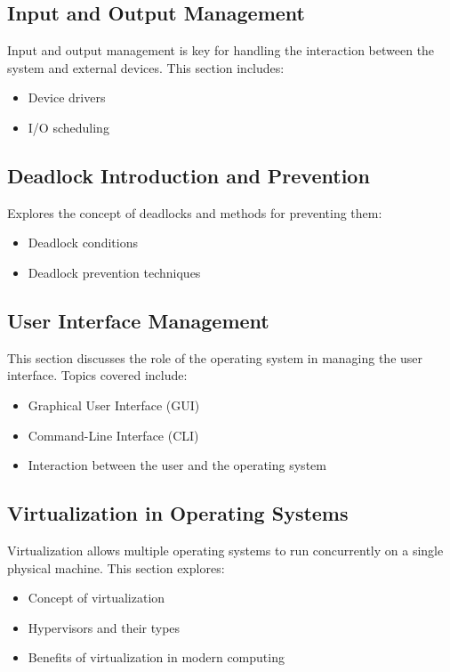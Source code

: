 \documentclass[12pt]{article}
\begin{document}
	\subsection{Input and Output Management}
	Input and output management is key for handling the interaction between the system and external devices. This section includes:
	\begin{itemize}
		\item Device drivers
		\item I/O scheduling
	\end{itemize}
	
	\subsection{Deadlock Introduction and Prevention}
	Explores the concept of deadlocks and methods for preventing them:
	\begin{itemize}
		\item Deadlock conditions
		\item Deadlock prevention techniques
	\end{itemize}
	
	\subsection{User Interface Management}
	This section discusses the role of the operating system in managing the user interface. Topics covered include:
	\begin{itemize}
		\item Graphical User Interface (GUI)
		\item Command-Line Interface (CLI)
		\item Interaction between the user and the operating system
	\end{itemize}
	
	\subsection{Virtualization in Operating Systems}
	Virtualization allows multiple operating systems to run concurrently on a single physical machine. This section explores:
	\begin{itemize}
		\item Concept of virtualization
		\item Hypervisors and their types
		\item Benefits of virtualization in modern computing
	\end{itemize}
	
\end{document}
